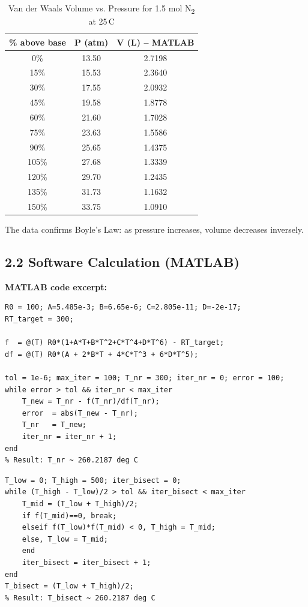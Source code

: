 \documentclass[12pt,a4paper]{article}
\begin{document}
\begin{table}[H]
\centering
\caption{Van der Waals Volume vs. Pressure for 1.5 mol N\textsubscript{2} at 25\,\textdegree C}
\label{tab:vdw}
\begin{tabular}{ccc}
  \toprule
  \textbf{\% above base} & \textbf{P (atm)} & \textbf{V (L) -- MATLAB} \\
  \midrule
  0\%   & 13.50 & 2.7198 \\
  15\%  & 15.53 & 2.3640 \\
  30\%  & 17.55 & 2.0932 \\
  45\%  & 19.58 & 1.8778 \\
  60\%  & 21.60 & 1.7028 \\
  75\%  & 23.63 & 1.5586 \\
  90\%  & 25.65 & 1.4375 \\
  105\% & 27.68 & 1.3339 \\
  120\% & 29.70 & 1.2435 \\
  135\% & 31.73 & 1.1632 \\
  150\% & 33.75 & 1.0910 \\
  \bottomrule
\end{tabular}
\end{table}

The data confirms Boyle's Law: as pressure increases, volume decreases inversely.

\subsection{2.2 Software Calculation (MATLAB)}

\textbf{MATLAB code excerpt:}
\begin{lstlisting}[style=matlabstyle, caption={Q2a -- Newton-Raphson for RTD temperature}]
% Constants
R0 = 100; A=5.485e-3; B=6.65e-6; C=2.805e-11; D=-2e-17;
RT_target = 300;

f  = @(T) R0*(1+A*T+B*T^2+C*T^4+D*T^6) - RT_target;
df = @(T) R0*(A + 2*B*T + 4*C*T^3 + 6*D*T^5);

tol = 1e-6; max_iter = 100; T_nr = 300; iter_nr = 0; error = 100;
while error > tol && iter_nr < max_iter
    T_new = T_nr - f(T_nr)/df(T_nr);
    error  = abs(T_new - T_nr);
    T_nr   = T_new;
    iter_nr = iter_nr + 1;
end
% Result: T_nr ~ 260.2187 deg C
\end{lstlisting}

\begin{lstlisting}[style=matlabstyle, caption={Q2a -- Interval Bisection Method}]
T_low = 0; T_high = 500; iter_bisect = 0;
while (T_high - T_low)/2 > tol && iter_bisect < max_iter
    T_mid = (T_low + T_high)/2;
    if f(T_mid)==0, break;
    elseif f(T_low)*f(T_mid) < 0, T_high = T_mid;
    else, T_low = T_mid;
    end
    iter_bisect = iter_bisect + 1;
end
T_bisect = (T_low + T_high)/2;
% Result: T_bisect ~ 260.2187 deg C
\end{lstlisting}
\end{document}
